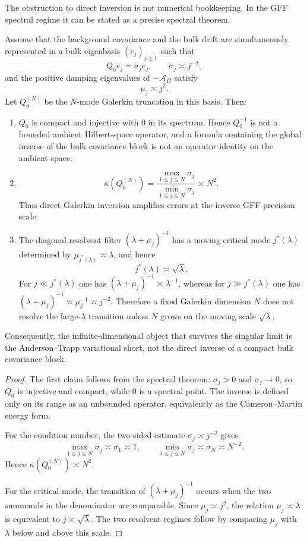 The obstruction to direct inversion is not numerical bookkeeping.  In the GFF
spectral regime it can be stated as a precise spectral theorem.

\begin{lemma}
\label{lem:gff_spectral_obstruction_appendix}
Assume that the background covariance and the bulk drift are simultaneously
represented in a bulk eigenbasis $(e_j)_{j\ge1}$ such that
\[
  Q_0e_j=\sigma_je_j,
  \qquad
  \sigma_j\asymp j^{-2},
\]
and the positive damping eigenvalues of $-\mathcal{A}_{II}$ satisfy
\[
  \mu_j\asymp j^2 .
\]
Let $Q_0^{(N)}$ be the $N$-mode Galerkin truncation in this basis.  Then:
\begin{enumerate}[label=(\roman*)]
\item $Q_0$ is compact and injective with $0$ in its spectrum.  Hence
$Q_0^{-1}$ is not a bounded ambient Hilbert-space operator, and a formula
containing the global inverse of the bulk covariance block is not an operator
identity on the ambient space.
\item
\[
  \kappa(Q_0^{(N)})
  =
  \frac{\max_{1\le j\le N}\sigma_j}{\min_{1\le j\le N}\sigma_j}
  \asymp N^2 .
\]
Thus direct Galerkin inversion amplifies errors at the inverse GFF precision
scale.
\item The diagonal resolvent filter $(\lambda+\mu_j)^{-1}$ has a moving critical
mode $j^*(\lambda)$ determined by $\mu_{j^*(\lambda)}\asymp\lambda$, and hence
\[
  j^*(\lambda)\asymp\sqrt{\lambda}.
\]
For $j\ll j^*(\lambda)$ one has
$(\lambda+\mu_j)^{-1}\asymp\lambda^{-1}$, whereas for
$j\gg j^*(\lambda)$ one has
$(\lambda+\mu_j)^{-1}\asymp\mu_j^{-1}\asymp j^{-2}$.  Therefore a fixed
Galerkin dimension $N$ does not resolve the large-$\lambda$ transition unless
$N$ grows on the moving scale $\sqrt{\lambda}$.
\end{enumerate}
Consequently, the infinite-dimensional object that survives the singular limit
is the Anderson--Trapp variational short, not the direct inverse of a compact
bulk covariance block.
\end{lemma}

\begin{proof}
The first claim follows from the spectral theorem: $\sigma_j>0$ and
$\sigma_j\to0$, so $Q_0$ is injective and compact, while $0$ is a spectral point.
The inverse is defined only on its range as an unbounded operator, equivalently
as the Cameron--Martin energy form.

For the condition number, the two-sided estimate
$\sigma_j\asymp j^{-2}$ gives
\[
  \max_{1\le j\le N}\sigma_j\asymp\sigma_1\asymp1,
  \qquad
  \min_{1\le j\le N}\sigma_j\asymp\sigma_N\asymp N^{-2}.
\]
Hence $\kappa(Q_0^{(N)})\asymp N^2$.

For the critical mode, the transition of $(\lambda+\mu_j)^{-1}$ occurs when the
two summands in the denominator are comparable.  Since $\mu_j\asymp j^2$, the
relation $\mu_j\asymp\lambda$ is equivalent to $j\asymp\sqrt{\lambda}$.  The two
resolvent regimes follow by comparing $\mu_j$ with $\lambda$ below and above this
scale.
\end{proof}

